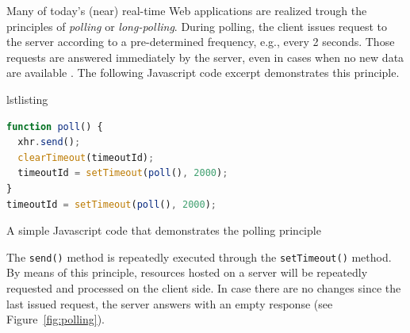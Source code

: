\documentclass[a4paper, justified, notoc]{tufte-handout} %
\makeatletter
\newenvironment{listing}[1][htbp] %
  {\ifvmode\else\unskip\fi\begin{@tufte@float}[#1]{lstlisting}{}}
  {\end{@tufte@float} } %
\makeatother
\begin{document}
Many of today's (near) real-time Web applications are realized trough the principles of \emph{polling} or \emph{long-polling}. During polling, the client issues request to the server according to a pre-determined frequency, e.g., every 2 seconds. Those requests are answered immediately by the server, even in cases when no new data are available . %
The following Javascript code excerpt demonstrates this principle. 

\begin{listing}
\begin{lstlisting}[language=JavaScript]
function poll() {
  xhr.send();
  clearTimeout(timeoutId);
  timeoutId = setTimeout(poll(), 2000);
}
timeoutId = setTimeout(poll(), 2000);
\end{lstlisting}
	\caption{A simple Javascript code that demonstrates the polling principle} 
	\label{polling}
\end{listing}

The \texttt{send()} method is repeatedly executed through the \texttt{setTimeout()} method. By means of this principle, resources hosted on a server will be repeatedly requested and processed on the client side.  In case there are no changes since the last issued request, the server answers with an empty response (see Figure~\ref{fig:polling}). 
\end{document}
